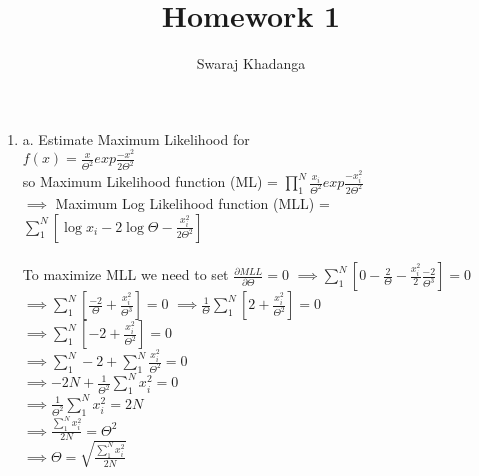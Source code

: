 \documentclass[]{report}
\title{Homework 1}
\author{Swaraj Khadanga}
\begin{document}
\maketitle

\begin{enumerate}
	\item a. Estimate Maximum Likelihood for \\
	$f(x)=\frac{x}{\Theta^2}exp{\frac{-x^2}{2\Theta^2}}$\\
	so Maximum Likelihood function (ML) = $\prod_{1}^{N}\frac{x_{i}}{\Theta^2}exp{\frac{-x_{i}^2}{2\Theta^2}}$ \\
	$\implies$ Maximum Log Likelihood function (MLL) = \\
	 $\sum_{1}^{N}[\log x_{i}-2\log \Theta-\frac{x_{i}^2}{2\Theta^2}]$ \\ \\
	To maximize MLL we need to set $\frac{\partial MLL}{\partial \Theta} = 0$
	$\implies \sum_{1}^{N}[0-\frac{2}{\Theta}-\frac{x_{i}^2}{2} \frac{-2}{\Theta^3}] = 0$ \\
	$\implies \sum_{1}^{N}[\frac{-2}{\Theta}+\frac{x_{i}^2}{\Theta^3}] = 0$	
	$\implies \frac{1}{\Theta}\sum_{1}^{N}[2+\frac{x_{i}^2}{\Theta^2}] = 0$	\\
	$\implies \sum_{1}^{N}[-2+\frac{x_{i}^2}{\Theta^2}] = 0$		\\
	$\implies \sum_{1}^{N}-2+ \sum_{1}^{N}\frac{x_{i}^2}{\Theta^2} = 0$		\\
	$\implies -2N+ \frac{1}{\Theta^2}\sum_{1}^{N}x_{i}^2 = 0$		\\
	$\implies \frac{1}{\Theta^2}\sum_{1}^{N}x_{i}^2 = 2N$		\\
	$\implies \frac{\sum_{1}^{N}x_{i}^2}{2N} = \Theta^2$		\\	
	$\implies \Theta = \sqrt{\frac{\sum_{1}^{N}x_{i}^2}{2N}}$		\\	
\end{enumerate}
\end{document}
